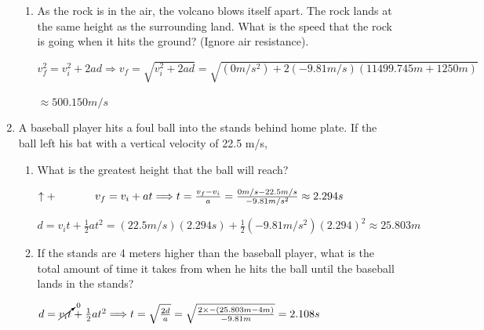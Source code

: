 \documentclass[letterpaper, 12pt]{article}
\begin{document}
\begin{enumerate}
\begin{enumerate}
		\item As the rock is in the air, the volcano blows itself apart.  The rock lands at the same height as the surrounding land.  What is the speed that the rock is going when it hits the ground? (Ignore air resistance).
		
		
		\color{red}
		\begin{center}
		$ v_f^2 = v_i^2 + 2ad \Longrightarrow v_f = \sqrt{v_i^2 + 2ad} = \sqrt{(0m/s^2) + 2(-9.81m/s)(11499.745m+1250m)}$
					
					 
			$\approx 500.150m/s $
			
		\end{center}
		\color{black}
		\vspace{0.15in}		
		
		
	\end{enumerate}
	\item A baseball player hits a foul ball into the stands behind home plate.  If the ball left his bat with a vertical velocity of 22.5 m/s, 
	
		\begin{enumerate}
		\item What is the greatest height that the ball will reach?
				
					\color{red}
				\begin{center}
					\vspace{.15in} \hspace{-1in} $\uparrow+ \hspace{0.5in}  v_f = v_i + a t \Longrightarrow t = \frac{v_f-v_i}{a} = \frac{0m/s - 22.5m/s}{-9.81m/s^2} \approx 2.294 s $
				\end{center}
				\begin{center}
					$ d = v_it + \frac{1}{2}at^2 = (22.5m/s)(2.294s)+\frac{1}{2}(-9.81m/s^2)(2.294)^2 \approx 25.803m $
				\end{center}
					

				\color{black}
				
				\vspace{.15in} 
			
		
		\item If the stands are 4 meters higher than the baseball player, what is the total amount of time it takes from when he hits the ball until the baseball lands in the stands?

											
			\color{red}
			\begin{center}
				$  d = \cancelto{0}{v_it} + \frac{1}{2}at^2 \Longrightarrow t = \sqrt{\frac{2d}{a}} = \sqrt{\frac{2\times -(25.803m-4m)}{-9.81m}} = 2.108s
				$
			\end{center}
			\color{black}


\end{enumerate}
\end{enumerate}
\end{document}
